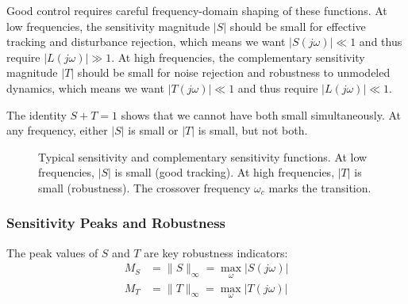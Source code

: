 Good control requires careful frequency-domain shaping of these functions. At low frequencies, the sensitivity magnitude $|S|$ should be small for effective tracking and disturbance rejection, which means we want $|S(j\omega)| \ll 1$ and thus require $|L(j\omega)| \gg 1$. At high frequencies, the complementary sensitivity magnitude $|T|$ should be small for noise rejection and robustness to unmodeled dynamics, which means we want $|T(j\omega)| \ll 1$ and thus require $|L(j\omega)| \ll 1$.

The identity $S + T = 1$ shows that we cannot have both small simultaneously. At any frequency, either $|S|$ is small or $|T|$ is small, but not both.

\begin{figure}[htbp]
\centering
{}
\caption{Typical sensitivity and complementary sensitivity functions. At low frequencies, $|S|$ is small (good tracking). At high frequencies, $|T|$ is small (robustness). The crossover frequency $\omega_c$ marks the transition.}
\label{fig:ST_bode}
\end{figure}

\subsubsection{Sensitivity Peaks and Robustness}

The peak values of $S$ and $T$ are key robustness indicators:
\begin{align}
M_S &= \|S\|_\infty = \max_\omega |S(j\omega)| \\
M_T &= \|T\|_\infty = \max_\omega |T(j\omega)|
\end{align}

